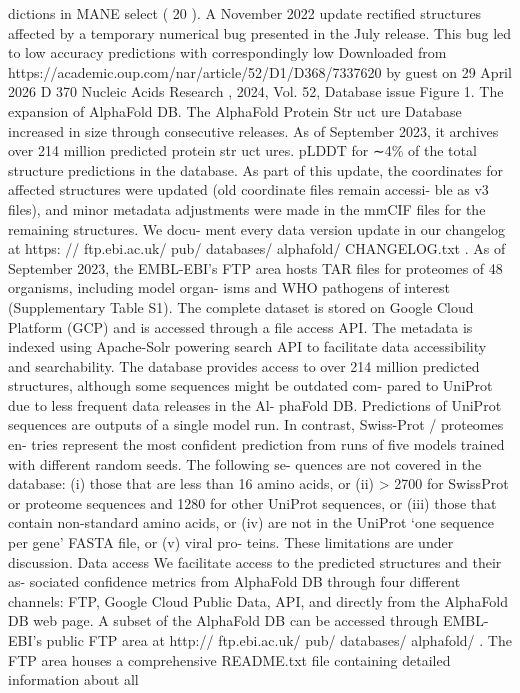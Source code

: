 dictions in MANE select ( 20 ).
A November 2022 update rectified structures affected by
a temporary numerical bug presented in the July release. This
bug led to low accuracy predictions with correspondingly low
Downloaded from https://academic.oup.com/nar/article/52/D1/D368/7337620 by guest on 29 April 2026
D 370
Nucleic Acids Research , 2024, Vol. 52, Database issue
Figure 1. The expansion of AlphaFold DB. The AlphaFold Protein Str uct ure Database increased in size through consecutive releases. As of September
2023, it archives over 214 million predicted protein str uct ures.
pLDDT for ∼4\% of the total structure predictions in the
database. As part of this update, the coordinates for affected
structures were updated (old coordinate files remain accessi-
ble as v3 files), and minor metadata adjustments were made
in the mmCIF files for the remaining structures. We docu-
ment every data version update in our changelog at https:
// ftp.ebi.ac.uk/ pub/ databases/ alphafold/ CHANGELOG.txt .
As of September 2023, the EMBL-EBI’s FTP area hosts TAR
files for proteomes of 48 organisms, including model organ-
isms and WHO pathogens of interest (Supplementary Table
S1). The complete dataset is stored on Google Cloud Platform
(GCP) and is accessed through a file access API. The metadata
is indexed using Apache-Solr powering search API to facilitate
data accessibility and searchability.
The database provides access to over 214 million predicted
structures, although some sequences might be outdated com-
pared to UniProt due to less frequent data releases in the Al-
phaFold DB. Predictions of UniProt sequences are outputs
of a single model run. In contrast, Swiss-Prot / proteomes en-
tries represent the most confident prediction from runs of five
models trained with different random seeds. The following se-
quences are not covered in the database: (i) those that are less
than 16 amino acids, or (ii) > 2700 for SwissProt or proteome
sequences and 1280 for other UniProt sequences, or (iii) those
that contain non-standard amino acids, or (iv) are not in the
UniProt ‘one sequence per gene’ FASTA file, or (v) viral pro-
teins. These limitations are under discussion.
Data access
We facilitate access to the predicted structures and their as-
sociated confidence metrics from AlphaFold DB through four
different channels: FTP, Google Cloud Public Data, API, and
directly from the AlphaFold DB web page.
A subset of the AlphaFold DB can be accessed through
EMBL-EBI’s public FTP area at http:// ftp.ebi.ac.uk/ pub/
databases/ alphafold/ . The FTP area houses a comprehensive
README.txt file containing detailed information about all
